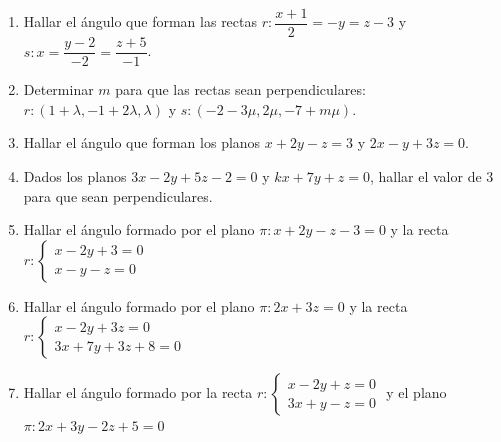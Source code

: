 \begin{enumerate}
\item Hallar el ángulo que forman las rectas $r:\dfrac {x+1}2=-y=z-3$ y $s:x=\dfrac {y-2}{-2}=\dfrac{z+5}{-1}$.

\vspace{2mm} 	

\item Determinar $m$ para que las rectas sean perpendiculares: $r:(1+\lambda,-1+2\lambda,\lambda)$ y $s:(-2-3\mu,2\mu,-7+m\mu)$.

\vspace{2mm} 	

\item Hallar el ángulo que forman los planos $x+2y- z=3$ y $2x- y+3z=0$.

\vspace{2mm} 	

\item Dados los planos $3x-2y+5z-2=0$ y $kx+7y+z=0$, hallar el valor de $3$  para que sean perpendiculares.

\vspace{2mm} 	

\item Hallar el ángulo formado por el plano $\pi: x+2y-z-3=0$ y la recta $r:\begin{cases}x-2y+3=0\\x-y-z=0\end{cases}$ 

\vspace{2mm} 	

\item  Hallar el ángulo formado por el plano $\pi: 2x+3z=0$ y la recta $r:\begin{cases} x-2y+3z=0\\3x+7y+3z+8=0\end{cases}$ 
 
\vspace{2mm} 	

\item Hallar el ángulo formado por la recta $r:\begin{cases} x-2y+z=0\\3x+y-z=0 \end{cases}$ y el plano $\pi: 2x+3y-2z+5=0$


\end{enumerate}
